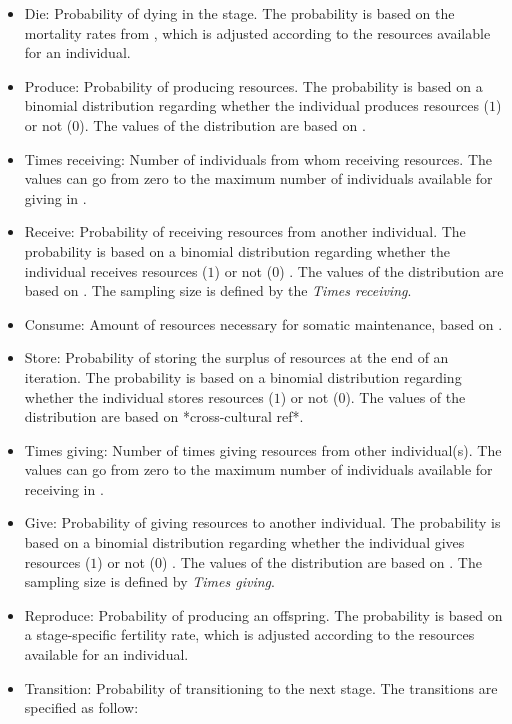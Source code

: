 \documentclass{article}
\begin{document}
\begin{itemize}
    \item Die: Probability of dying in the stage. The probability is based on the mortality rates from \cite{gurven2007longevity}, which is adjusted according to the resources available for an individual.
    \item Produce: Probability of producing resources. The probability is based on a binomial distribution regarding whether the individual produces resources ($1$) or not ($0$). The values of the distribution are based on \cite{koster2020life}.
    \item Times receiving: Number of individuals from whom receiving resources. The values can go from zero to the maximum number of individuals available for giving in \cite{gurven2004give}.
    \item Receive: Probability of receiving resources from another individual. The probability is based on a binomial distribution regarding whether the individual receives resources ($1$) or not ($0$) . The values of the distribution are based on \cite{gurven2004give}. The sampling size is defined by the \emph{Times receiving}.
    \item Consume: Amount of resources necessary for somatic maintenance, based on \cite{kaplan2000theory}.
    \item Store: Probability of storing the surplus of resources at the end of an iteration. The probability is based on a binomial distribution regarding whether the individual stores resources ($1$) or not ($0$). The values of the distribution are based on *cross-cultural ref*.
    \item Times giving: Number of times giving resources from other individual(s). The values can go from zero to the maximum number of individuals available for receiving in \cite{gurven2004give}.
    \item Give: Probability of giving resources to another individual. The probability is based on a binomial distribution regarding whether the individual gives resources ($1$) or not ($0$) . The values of the distribution are based on \cite{gurven2004give}. The sampling size is defined by \emph{Times giving}.
    \item Reproduce: Probability of producing an offspring. The probability is based on a stage-specific fertility rate, which is adjusted according to the resources available for an individual.
    \item Transition: Probability of transitioning to the next stage. The transitions are specified as follow:

\end{itemize}
\end{document}

